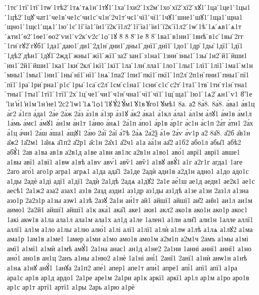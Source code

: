 {́1тє
́1тї
́1тї
́1тѡ
́1тѣ2
́1тѧ
́тѧ1н
́1тꙋ1
́1ха
́1хи2
́1х2м
́1хо
́хї2
́хї2
́хꙋ1
́1ца
́1це1
́1цы1
́1цѣ2
́1цꙋ
́чат1
́че1в
́че1с
́чи1с
́ч1н
́2ч1т
́чє1
́чї1
́чї1
́1чꙋ1
́шне1
́шꙋ1
́1ща1
́щна1
́щно1
́1щє1
́щѧ1
́1ю
́1є
́1ї
́їа1
́їи1
́ї2к
́ї1л2
́1ї
́їа1
́їи1
́ї2к
́ї1л2
́1ѡ
́1ѣ
́1ѧ
́ѧв1
́ѧ1т
́ѧти1
́ѳ2
́1ѳе1
́ѳо2
́ѵи1
́ѵ2к
́ѵ2с
́1ѻ
́1ꙋ
8̆
8̇
8̈
̈1е
8̏
8̑
̑1ва1
̑в1ни1
̑1внѣ
̑в1с
̑1вы
̑2гг
̑1ги
̑гꙋ2
̑гꙋб1
̑1да1
̑даю1
̑ди1
̑2д1н
̑дни1
̑дны1
̑днї1
̑днї1
̑1до1
̑1др
̑1ды
̑1дї1
̑1дї1
̑1дѣ2
̑дѣн1
̑1дꙋ1
̑2жд1
̑жны1
̑жї1
̑жї1
̑за2
̑зан1
̑з1на1
̑1зни
̑зны1
̑1зы
̑1и2
̑й1
̑йши1
̑ин1
̑2й1
̑йши1
̑1ка1
̑1ки
̑2кл
̑1кї1
̑1кї1
̑1ла
̑1ли
̑лла1
̑1ло1
̑1лы1
̑1лї1
̑1лї1
̑1ма1
̑м1н
̑мны1
̑1мы1
̑1ни1
̑1ны
̑нї1
̑нї1
̑1нѧ
̑1па2
̑1пи1
̑пкї1
̑пкї1
̑1п2л
̑2п1н
̑пни1
̑пны1
̑пї1
̑пї1
̑1ра
̑1ри
̑рна1
̑р1с
̑1ры
̑1са
̑с2л
̑1см
̑с1на1
̑1сни
̑с1с
̑с2т
̑1та1
̑1тв
̑1ти
̑т1н
̑тна1
̑тны1
̑1ты1
̑1тї1
̑1тї1
̑2х
̑1ц
̑че1
̑чи1
̑ч1н
̑чна1
̑чї1
̑чї1
̑1щ
̑ща1
̑1ю1
̑1ѧ2
̑ѧн1
̑ѵ1
8̾
̾1е
̾1и
̾и́1
̾и1м
̾1н
̾не1
̾2с2
̾1ѡ1
̾1ѧ
̾1ѻ1
̾1ꙋ
̾ꙋ́2
̾ꙋ́м1
̾ꙋ1в
̾ꙋго1
̾ꙋмѣ1
8а.
а2̀
8а̀8.
8а́8.
а́ва1
а́в1ц
а́г2
а́1гл
а́да1
2а́е
2а́ж
2а́з
а́з1в
а́1зр
а́з1ꙋ
а́к2
а́ка1
а́1кл
а́ла1
а́л1м
а́лꙋ1
а́м1в
а́м1л
1а́мь
а́мє1
а́мꙋ1
а́н1м
а́н1т
1а́ню
а́нѧ1
2а́1п
а́по1
а́р1в
а́р1г
а́с1н
а́с1п
2а́т
а́ти1
2а́х
а́1ц
а́чи1
2а́ш
а́ша1
а́щꙋ1
2а́ю
2а́ї
2а́ї
а́7ѣ
2а́ѧ
2а́2ѯ
а́1ѳ
2а́ѵ
а́ѵ1р
а2̑
8а̑8.
а̑2б
а̑в1н
а̑ж2
1а̑2м1
1а̑нѧ
а̑1п2
а̑2р1
а̑с1н
2а̑х1
а̑2ч1
а1а
аа́1н
аа̑2
а1б2
або1л
абы̑1
абѣ2
абꙋ́1
2ав
а1ва
ав1в
а2в1д
а1ве
а1ви
ав1лє
а2в1н
а1во1
аво́1
аврї1
аврї1
авше1
а1вы
авї1
а1вї1
а1вѡ
а1вѣ
а1вѵ
авѵ́1
авѷ1
авѷ1
а1вꙋ
авꙋ́1
а1г
а2г1г
агда1
1аге
2аго
аго́1
аго1р
агра1
агрѧ1
а1да
ада̑1
2а1де
2адѝ
ади1в
а2д1н
адно1
а1до
адо1с
а1ды
2адѐ
а1ді
адї1
а1дї1
2адѝ
2а1дѣ
2адѧ
а1дꙋ2
2а1е
ае́1ш
ае1д
аеди1
ае2к1
ае1с
аесѣ1
2а1ж2
аза2
азах1
аз1в
2азд
азди1
аз1др
аз1ды
аз1дѣ
а1зе
а1зи
2аз1л
а1зна
азо1р
2а2з1р
а1зы
азѡ1
а1зѣ
2азꙋ
2а1и
аи́1т
ай1
айшї1
айшї1
аи̑2
аи̑н1
аи1л
аи1м
аимо1
2а2й1
айшї1
айшї1
а1к
ака́1
ака̑1
аке1
аки1
акл2
ако1в
ако1н
ако1р
акос1
1акі
акѡ1в
а1ла
ала1л
ала1м
ала1х
ал1д
а1ле
1ален1
а1ли
али̑1
али1н
1алле
аллї1
аллї1
ал1м
а1ло
а1лы
а1лю
алю́1
а1лі
алї1
а1лї1
а1лѝ
а1лѡ
а1лѣ
а1лѧ
а1лꙋ2
а1ма
ама1р
1ам1в
а1ме1
1амер
а1ми
а1мо
амо1в
амо1м
а2м1п
а2м1ч
2амъ
а1мы
а1мі
амї1
а1мї1
а1мѝ
а1мѣ
амꙋ́1
2а1на
анас1
ан1д
а1не2
2а1ни
1анні
аннї1
аннї1
а1но
ано́1
ано1в
ан1ц
2анъ
а1ны
а1ню2
а1нѐ
1а1ні
ані́1
2анї1
2анї1
а1нѝ
анѡ1н
а1нѣ
а1нѧ
а1нꙋ
анꙋ́1
1анꙋа
2а1п2
апе́1
апер1
апе1т
апи́1
апре1
апі́1
апї1
апї1
а1ра
ара1с
ар1в
ар1д
ардо1
2а1ре
аре1м
2а1ри
ар1к
аркї1
аркї1
ар1л
ар1м
а1ро
аро1в
ар1с
ар1т
артї1
артї1
а1ры
2арь
а1рю
а1рѐ
}
